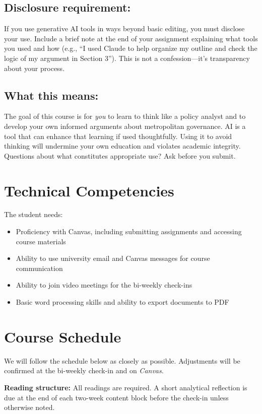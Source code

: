 \documentclass[12pt]{article}
\begin{document}
\subsection*{Disclosure requirement:}
If you use generative AI tools in ways beyond basic editing, you must disclose your use. Include a brief note at the end of your assignment explaining what tools you used and how (e.g., ``I used Claude to help organize my outline and check the logic of my argument in Section 3''). This is not a confession---it's transparency about your process.

\subsection*{What this means:}
The goal of this course is for \emph{you} to learn to think like a policy analyst and to develop your own informed arguments about metropolitan governance. AI is a tool that can enhance that learning if used thoughtfully. Using it to avoid thinking will undermine your own education and violates academic integrity. Questions about what constitutes appropriate use? Ask before you submit.

\section*{Technical Competencies}
The student needs:
\begin{itemize}
\item Proficiency with Canvas, including submitting assignments and accessing course materials
\item Ability to use university email and Canvas messages for course communication
\item Ability to join video meetings for the bi-weekly check-ins
\item Basic word processing skills and ability to export documents to PDF
\end{itemize}

\section*{Course Schedule}

We will follow the schedule below as closely as possible. Adjustments will be confirmed at the bi-weekly check-in and on \emph{Canvas}.

\vspace{0.5em}
\noindent \textbf{Reading structure:} All readings are required. A short analytical reflection is due at the end of each two-week content block before the check-in unless otherwise noted.
\end{document}
